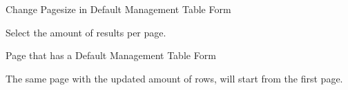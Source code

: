 
\begin{uc}{Change Pagesize in Default Management Table Form}

    \begin{uc-mss}
        \item Select the amount of results per page.
    \end{uc-mss}

    \begin{uc-pre}
    \item Page that has a Default Management Table Form
    \end{uc-pre}

    \begin{uc-post}
    \item The same page with the updated amount of rows, will start from the first page.
    \end{uc-post}

\end{uc}

